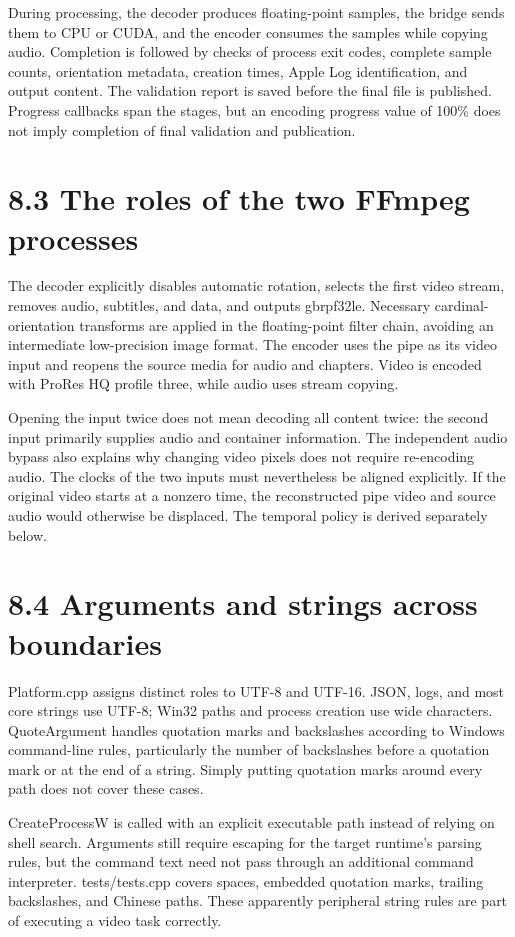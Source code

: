 \documentclass[11pt,a4paper,openany]{book}
\begin{document}
During processing, the decoder produces floating-point samples, the bridge sends them to CPU or CUDA, and the encoder consumes the samples while copying audio. Completion is followed by checks of process exit codes, complete sample counts, orientation metadata, creation times, Apple Log identification, and output content. The validation report is saved before the final file is published. Progress callbacks span the stages, but an encoding progress value of 100\% does not imply completion of final validation and publication.


\section*{8.3 The roles of the two FFmpeg processes}
The decoder explicitly disables automatic rotation, selects the first video stream, removes audio, subtitles, and data, and outputs gbrpf32le. Necessary cardinal-orientation transforms are applied in the floating-point filter chain, avoiding an intermediate low-precision image format. The encoder uses the pipe as its video input and reopens the source media for audio and chapters. Video is encoded with ProRes HQ profile three, while audio uses stream copying.

Opening the input twice does not mean decoding all content twice: the second input primarily supplies audio and container information. The independent audio bypass also explains why changing video pixels does not require re-encoding audio. The clocks of the two inputs must nevertheless be aligned explicitly. If the original video starts at a nonzero time, the reconstructed pipe video and source audio would otherwise be displaced. The temporal policy is derived separately below.


\section*{8.4 Arguments and strings across boundaries}
Platform.cpp assigns distinct roles to UTF-8 and UTF-16. JSON, logs, and most core strings use UTF-8; Win32 paths and process creation use wide characters. QuoteArgument handles quotation marks and backslashes according to Windows command-line rules, particularly the number of backslashes before a quotation mark or at the end of a string. Simply putting quotation marks around every path does not cover these cases.

CreateProcessW is called with an explicit executable path instead of relying on shell search. Arguments still require escaping for the target runtime's parsing rules, but the command text need not pass through an additional command interpreter. tests/tests.cpp covers spaces, embedded quotation marks, trailing backslashes, and Chinese paths. These apparently peripheral string rules are part of executing a video task correctly.
\end{document}
